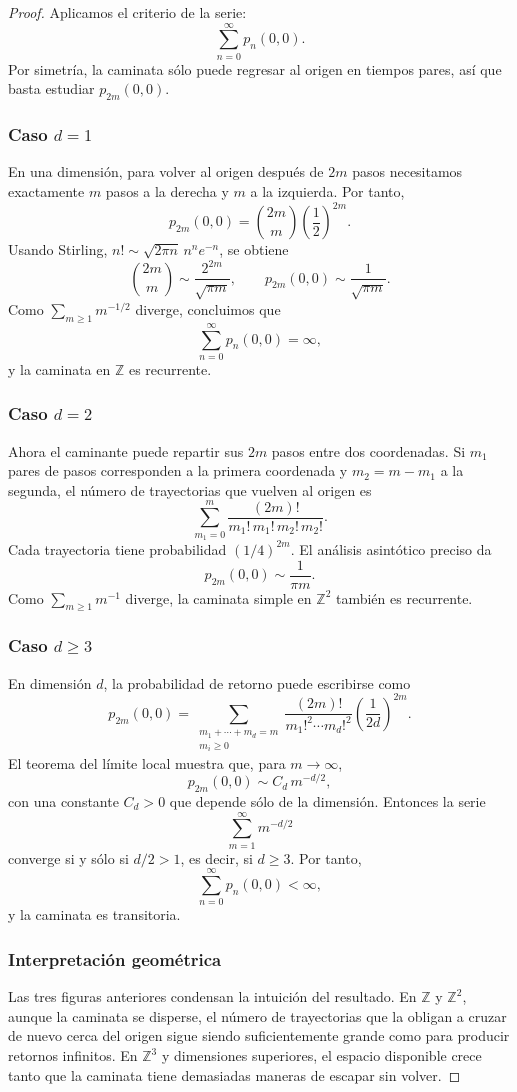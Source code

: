 \documentclass[11pt,a4paper]{article}
\theoremstyle{plain}
\theoremstyle{definition}
\theoremstyle{remark}
\newcommand{\Z}{\mathbb{Z}}
\newcommand{\1}{\mathds{1}}
\begin{document}
\begin{proof}
Aplicamos el criterio de la serie:
\[
\sum_{n=0}^{\infty} p_n(0,0).
\]
Por simetría, la caminata sólo puede regresar al origen en tiempos pares, así que basta estudiar \(p_{2m}(0,0)\).

\subsubsection*{Caso \(d=1\)}
En una dimensión, para volver al origen después de \(2m\) pasos necesitamos exactamente \(m\) pasos a la derecha y \(m\) a la izquierda. Por tanto,
\[
p_{2m}(0,0)=\binom{2m}{m}\left(\frac12\right)^{2m}.
\]
Usando Stirling, \(n!\sim \sqrt{2\pi n}\,n^n e^{-n}\), se obtiene
\[
\binom{2m}{m}\sim \frac{2^{2m}}{\sqrt{\pi m}},
\qquad
p_{2m}(0,0)\sim \frac{1}{\sqrt{\pi m}}.
\]
Como \(\sum_{m\ge1} m^{-1/2}\) diverge, concluimos que
\[
\sum_{n=0}^{\infty} p_n(0,0)=\infty,
\]
y la caminata en \(\Z\) es recurrente.

\subsubsection*{Caso \(d=2\)}
Ahora el caminante puede repartir sus \(2m\) pasos entre dos coordenadas. Si \(m_1\) pares de pasos corresponden a la primera coordenada y \(m_2=m-m_1\) a la segunda, el número de trayectorias que vuelven al origen es
\[
\sum_{m_1=0}^{m} \frac{(2m)!}{m_1!\,m_1!\,m_2!\,m_2!}.
\]
Cada trayectoria tiene probabilidad \((1/4)^{2m}\). El análisis asintótico preciso da
\[
p_{2m}(0,0)\sim \frac{1}{\pi m}.
\]
Como \(\sum_{m\ge1} m^{-1}\) diverge, la caminata simple en \(\Z^2\) también es recurrente.

\subsubsection*{Caso \(d\ge 3\)}
En dimensión \(d\), la probabilidad de retorno puede escribirse como
\[
p_{2m}(0,0)=
\sum_{\substack{m_1+\cdots+m_d=m\\ m_i\ge0}}
\frac{(2m)!}{m_1!^2\cdots m_d!^2}
\left(\frac{1}{2d}\right)^{2m}.
\]
El teorema del límite local muestra que, para \(m\to\infty\),
\[
p_{2m}(0,0)\sim C_d\,m^{-d/2},
\]
con una constante \(C_d>0\) que depende sólo de la dimensión. Entonces la serie
\[
\sum_{m=1}^{\infty} m^{-d/2}
\]
converge si y sólo si \(d/2>1\), es decir, si \(d\ge3\). Por tanto,
\[
\sum_{n=0}^{\infty} p_n(0,0)<\infty,
\]
y la caminata es transitoria.

\subsubsection*{Interpretación geométrica}
Las tres figuras anteriores condensan la intuición del resultado. En \(\Z\) y \(\Z^2\), aunque la caminata se disperse, el número de trayectorias que la obligan a cruzar de nuevo cerca del origen sigue siendo suficientemente grande como para producir retornos infinitos. En \(\Z^3\) y dimensiones superiores, el espacio disponible crece tanto que la caminata tiene demasiadas maneras de escapar sin volver.
\end{proof}
\end{document}
